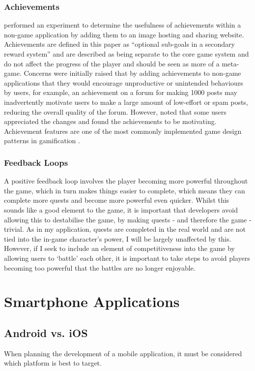 \subsubsection{Achievements}
\cite{Montola:2009:AGA:1621841.1621859} performed an experiment to determine the usefulness of achievements within a non-game application by adding them to an image hosting and sharing website.
Achievements are defined in this paper as ``optional sub-goals in a secondary reward system'' and are described as being separate to the core game system and do not affect the progress of the player and should be seen as more of a meta-game. 
Concerns were initially raised that by adding achievements to non-game applications that they would encourage unproductive or unintended behaviours by users, for example, an achievement on a forum for making 1000 posts may inadvertently motivate users to make a large amount of low-effort or spam posts, reducing the overall quality of the forum.
However, \cite{Montola:2009:AGA:1621841.1621859} noted that some users appreciated the changes and found the achievements to be motivating.
Achievement features are one of the most commonly implemented game design patterns in gamification \citep{hamari2011framework}. 

\subsubsection{Feedback Loops}
A positive feedback loop involves the player becoming more powerful throughout the game, which in turn makes things easier to complete, which means they can complete more quests and become more powerful even quicker.
Whilst this sounds like a good element to the game, it is important that developers avoid allowing this to destabilise the game, by making quests - and therefore the game - trivial.
As in my application, quests are completed in the real world and are not tied into the in-game character's power, I will be largely unaffected by this.
However, if I seek to include an element of competitiveness into the game by allowing users to `battle' each other, it is important to take steps to avoid players becoming too powerful that the battles are no longer enjoyable.

\section{Smartphone Applications}
\subsection{Android vs. iOS}
When planning the development of a mobile application, it must be considered which platform is best to target. 

